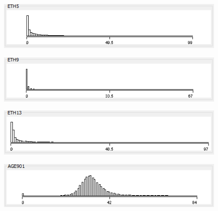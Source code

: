 \begin{figure}
\includegraphics{./images/expl_rep/Cattura3-3-1}
\end{figure}
\begin{figure}
\includegraphics{./images/expl_rep/Cattura3-3-2}
\end{figure}
\begin{figure}
\includegraphics{./images/expl_rep/Cattura3-3-3}
\end{figure}
\begin{figure}
\includegraphics{./images/expl_rep/Cattura3-3-4}
\end{figure}
